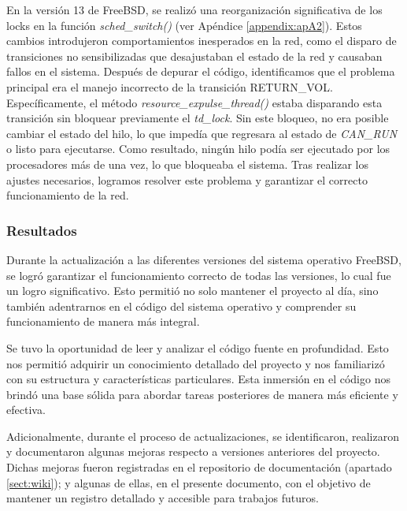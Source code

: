En la versión 13 de FreeBSD, se realizó una reorganización significativa de los locks en la función \textit{sched\_switch()} (ver Apéndice \ref{appendix:apA2}). Estos cambios introdujeron comportamientos inesperados en la red, como el disparo de transiciones no sensibilizadas que desajustaban el estado de la red y causaban fallos en el sistema. Después de depurar el código, identificamos que el problema principal era el manejo incorrecto de la transición RETURN\_VOL. Específicamente, el método \textit{resource\_expulse\_thread()} estaba disparando esta transición sin bloquear previamente el \textit{td\_lock}. Sin este bloqueo, no era posible cambiar el estado del hilo, lo que impedía que regresara al estado de \textit{CAN\_RUN} o listo para ejecutarse. Como resultado, ningún hilo podía ser ejecutado por los procesadores más de una vez, lo que bloqueaba el sistema. Tras realizar los ajustes necesarios, logramos resolver este problema y garantizar el correcto funcionamiento de la red.\par

\subsubsection{Resultados}

Durante la actualización a las diferentes versiones del sistema operativo FreeBSD, se logró garantizar el funcionamiento correcto de todas las versiones, lo cual fue un logro significativo. Esto permitió no solo mantener el proyecto al día, sino también adentrarnos en el código del sistema operativo y comprender su funcionamiento de manera más integral.\par

Se tuvo la oportunidad de leer y analizar el código fuente en profundidad. Esto nos permitió adquirir un conocimiento detallado del proyecto y nos familiarizó con su estructura y características particulares. Esta inmersión en el código nos brindó una base sólida para abordar tareas posteriores de manera más eficiente y efectiva.\par

Adicionalmente, durante el proceso de actualizaciones, se identificaron, realizaron y documentaron algunas mejoras respecto a versiones anteriores del proyecto. Dichas mejoras fueron registradas en el repositorio de documentación (apartado \ref{sect:wiki}); y algunas de ellas, en el presente documento, con el objetivo de mantener un registro detallado y accesible para trabajos futuros.\par

